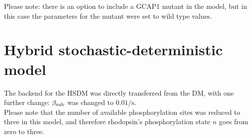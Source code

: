 \documentclass[a4paper, 12pt]{book}
\begin{document}
Please note: there is an option to include a GCAP1 mutant in the model, but in this case the parameters for the mutant were set to wild type values.

\section*{Hybrid stochastic-deterministic model}
\label{sec_appendix_small}
The backend for the HSDM was directly transferred from the DM, with one further change: $\beta_{\rm sub}$ was changed to $0.01/\mathrm{s}$.\\
Please note that the number of available phosphorylation sites was reduced to three in this model, and therefore rhodopsin's phosphorylation state $n$ goes from zero to three.\\
\end{document}
